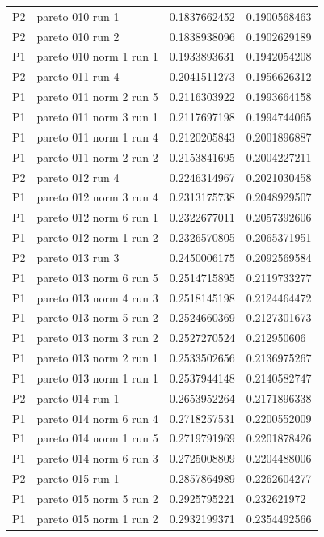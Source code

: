 \begin{tabular}{@{}llll@{}}
P2 & pareto 010 run 1 & 0.1837662452 & 0.1900568463 \\
P2 & pareto 010 run 2 & 0.1838938096 & 0.1902629189 \\
P1 & pareto 010 norm 1 run 1 & 0.1933893631 & 0.1942054208 \\
P2 & pareto 011 run 4 & 0.2041511273 & 0.1956626312 \\
P1 & pareto 011 norm 2 run 5 & 0.2116303922 & 0.1993664158 \\
P1 & pareto 011 norm 3 run 1 & 0.2117697198 & 0.1994744065 \\
P1 & pareto 011 norm 1 run 4 & 0.2120205843 & 0.2001896887 \\
P1 & pareto 011 norm 2 run 2 & 0.2153841695 & 0.2004227211 \\
P2 & pareto 012 run 4 & 0.2246314967 & 0.2021030458 \\
P1 & pareto 012 norm 3 run 4 & 0.2313175738 & 0.2048929507 \\
P1 & pareto 012 norm 6 run 1 & 0.2322677011 & 0.2057392606 \\
P1 & pareto 012 norm 1 run 2 & 0.2326570805 & 0.2065371951 \\
P2 & pareto 013 run 3 & 0.2450006175 & 0.2092569584 \\
P1 & pareto 013 norm 6 run 5 & 0.2514715895 & 0.2119733277 \\
P1 & pareto 013 norm 4 run 3 & 0.2518145198 & 0.2124464472 \\
P1 & pareto 013 norm 5 run 2 & 0.2524660369 & 0.2127301673 \\
P1 & pareto 013 norm 3 run 2 & 0.2527270524 & 0.212950606 \\
P1 & pareto 013 norm 2 run 1 & 0.2533502656 & 0.2136975267 \\
P1 & pareto 013 norm 1 run 1 & 0.2537944148 & 0.2140582747 \\
P2 & pareto 014 run 1 & 0.2653952264 & 0.2171896338 \\
P1 & pareto 014 norm 6 run 4 & 0.2718257531 & 0.2200552009 \\
P1 & pareto 014 norm 1 run 5 & 0.2719791969 & 0.2201878426 \\
P1 & pareto 014 norm 6 run 3 & 0.2725008809 & 0.2204488006 \\
P2 & pareto 015 run 1 & 0.2857864989 & 0.2262604277 \\
P1 & pareto 015 norm 5 run 2 & 0.2925795221 & 0.232621972 \\
P1 & pareto 015 norm 1 run 2 & 0.2932199371 & 0.2354492566 \\

\end{tabular}
